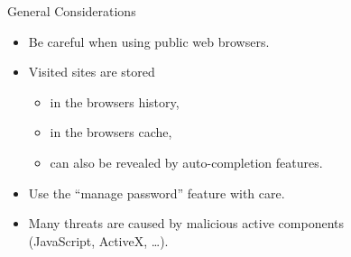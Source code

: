 \documentclass{beamer}
\begin{document}
\begin{slide}{General Considerations}
  \begin{itemize}\itemsep=2ex
    \item Be careful when using public web browsers. 
    \item Visited sites are stored
      \begin{itemize}\itemsep=1.5ex
      \item in the browsers history, 
      \item in the browsers cache,
      \item can also be revealed by auto-completion features.
    \end{itemize}
  \item Use the ``manage password'' feature with care.
  \item Many threats are caused by malicious active components \\
    (JavaScript, ActiveX, \ldots).
  \end{itemize}
  \end{slide}

\end{document}
